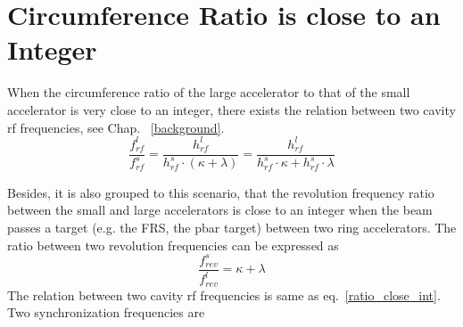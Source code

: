 \section{Circumference Ratio is close to an Integer}
\label{sec:close_to_int}
When the circumference ratio of the large accelerator to that of the small accelerator is very close to an integer, there exists the relation between two cavity rf frequencies, see Chap. ~\ref{background}. 
\begin{equation} 
\label{ratio_close_int}
\frac{f_{\mathit{rf}}^{l}}{f_{\mathit{rf}}^{s}}=\frac{h^l_\mathit{rf}}{h^s_\mathit{rf} \cdot ( \kappa+ \lambda)}=\frac{h^l_\mathit{rf}}{h^s_\mathit{rf} \cdot  \kappa+h^s_\mathit{rf} \cdot \lambda}
\end{equation}




Besides, it is also grouped to this scenario, that the revolution frequency ratio between the small and large accelerators is close to an integer when the beam passes a target (e.g. the FRS, the pbar target) between two ring accelerators. The ratio between two revolution frequencies can be expressed as
\begin{equation} 
\frac{f_{\mathit{rev}}^{s}}{f_{\mathit{rev}}^{l}}=\kappa+ \lambda\label{close_to_interger1}
\end{equation}
The relation between two cavity rf frequencies is same as eq.~\ref{ratio_close_int}. Two synchronization frequencies are

